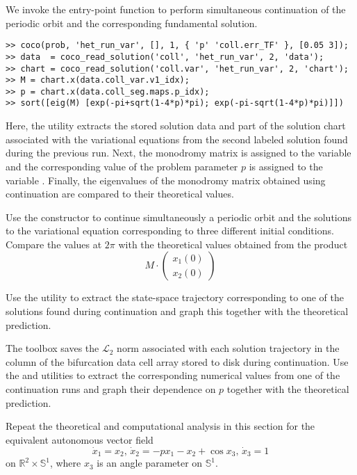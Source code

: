 We invoke the  entry-point function to perform simultaneous continuation of the periodic orbit and the corresponding fundamental solution.
\begin{lstlisting}[language=coco-highlight]
>> coco(prob, 'het_run_var', [], 1, { 'p' 'coll.err_TF' }, [0.05 3]);
>> data  = coco_read_solution('coll', 'het_run_var', 2, 'data');
>> chart = coco_read_solution('coll.var', 'het_run_var', 2, 'chart');
>> M = chart.x(data.coll_var.v1_idx);
>> p = chart.x(data.coll_seg.maps.p_idx);
>> sort([eig(M) [exp(-pi+sqrt(1-4*p)*pi); exp(-pi-sqrt(1-4*p)*pi)]])
\end{lstlisting}
Here, the  utility extracts the stored solution data and part of the solution chart associated with the variational equations from the second labeled solution found during the previous run.  Next, the monodromy matrix is assigned to the variable  and the corresponding value of the problem parameter $p$ is assigned to the variable . Finally, the eigenvalues of the monodromy matrix obtained using continuation are compared to their theoretical values.
\newline
\begin{exercises}
\item Use the  constructor to continue simultaneously a periodic orbit and the solutions to the variational equation corresponding to three different initial conditions. Compare the values at $2\pi$ with the theoretical values obtained from the product
\[
M\cdot\left(\begin{array}{c}x_1(0)\\x_2(0)\end{array}\right)
\]

\item Use the  utility to extract the state-space trajectory corresponding to one of the solutions found during continuation and graph this together with the theoretical prediction.

\item The  toolbox saves the $\mathcal{L}_2$ norm associated with each solution trajectory in the  column of the bifurcation data cell array stored to disk during continuation. Use the  and  utilities to extract the corresponding numerical values from one of the continuation runs and graph their dependence on $p$ together with the theoretical prediction.

\item Repeat the theoretical and computational analysis in this section for the equivalent autonomous vector field
\[
\dot{x}_1=x_2,\,\dot{x}_2=-px_1-x_2+\cos x_3,\,\dot{x}_3=1
\]
on $\mathbb{R}^2\times\mathbb{S}^1$, where $x_3$ is an angle parameter on $\mathbb{S}^1$.
\end{exercises}

